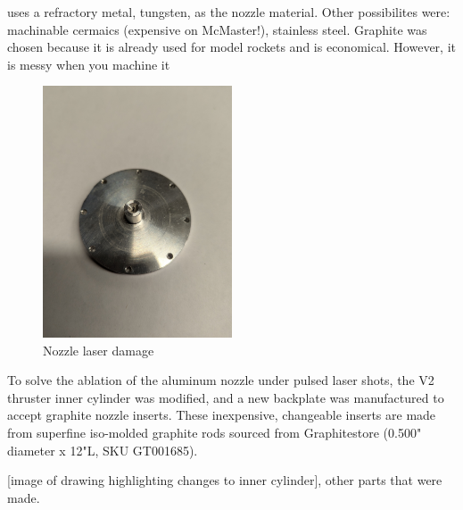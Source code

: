    \textcite{toyodaThrustPerformanceCW2002} uses a refractory metal, tungsten, as the nozzle material. Other possibilites were: machinable cermaics (expensive on McMaster!), stainless steel. Graphite was chosen because it is already used for model rockets and is economical. However, it is messy when you machine it 

    \begin{figure}[!ht]
        \centering
        \includegraphics[width=0.5\textwidth]{assets/4 experiments/Nozzle damage.jpg}
        \caption{Nozzle laser damage}
    \end{figure}

    To solve the ablation of the aluminum nozzle under pulsed laser shots, the V2 thruster inner cylinder was modified, and a new backplate was manufactured to accept graphite nozzle inserts. These inexpensive, changeable inserts are made from superfine iso-molded graphite rods sourced from Graphitestore (0.500" diameter x 12"L, SKU GT001685).

    [image of drawing highlighting changes to inner cylinder], other parts that were made.




    